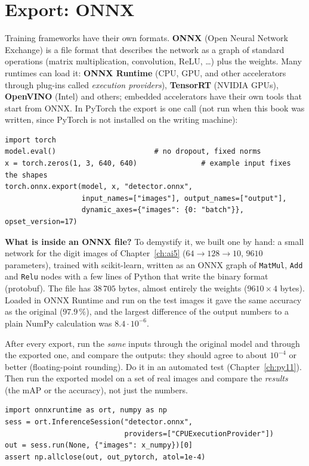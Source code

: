 \section*{Export: ONNX}
Training frameworks have their own formats. \textbf{ONNX} (Open Neural Network Exchange) is a file format that describes the network as a graph of standard operations (matrix multiplication, convolution, ReLU, \dots) plus the weights. Many runtimes can load it: \textbf{ONNX Runtime} (CPU, GPU, and other accelerators through plug-ins called \emph{execution providers}), \textbf{TensorRT} (NVIDIA GPUs), \textbf{OpenVINO} (Intel) and others; embedded accelerators have their own tools that start from ONNX. In PyTorch the export is one call (not run when this book was written, since PyTorch is not installed on the writing machine):
\begin{verbatim}
import torch
model.eval()                       # no dropout, fixed norms
x = torch.zeros(1, 3, 640, 640)               # example input fixes the shapes
torch.onnx.export(model, x, "detector.onnx",
                  input_names=["images"], output_names=["output"],
                  dynamic_axes={"images": {0: "batch"}}, opset_version=17)
\end{verbatim}
\textbf{What is inside an ONNX file?} To demystify it, we built one by hand: a small network for the digit images of Chapter~\ref{ch:ai5} ($64\to128\to10$, $9610$ parameters), trained with scikit-learn, written as an ONNX graph of \texttt{MatMul}, \texttt{Add} and \texttt{Relu} nodes with a few lines of Python that write the binary format (protobuf). The file has $38\,705$ bytes, almost entirely the weights ($9610\times4$ bytes). Loaded in ONNX Runtime and run on the test images it gave the same accuracy as the original ($97.9\,\%$), and the largest difference of the output numbers to a plain NumPy calculation was $8.4\cdot10^{-6}$.
\begin{keyidea}
After every export, run the \emph{same} inputs through the original model and through the exported one, and compare the outputs: they should agree to about $10^{-4}$ or better (floating-point rounding). Do it in an automated test (Chapter~\ref{ch:py11}). Then run the exported model on a set of real images and compare the \emph{results} (the mAP or the accuracy), not just the numbers.
\end{keyidea}
\begin{verbatim}
import onnxruntime as ort, numpy as np
sess = ort.InferenceSession("detector.onnx",
                            providers=["CPUExecutionProvider"])
out = sess.run(None, {"images": x_numpy})[0]
assert np.allclose(out, out_pytorch, atol=1e-4)
\end{verbatim}

